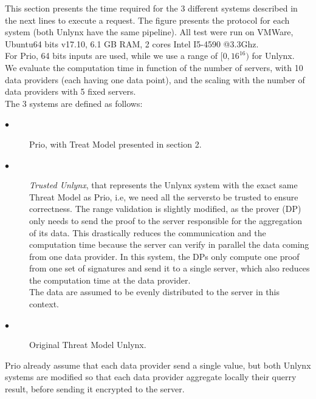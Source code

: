 \documentclass{article}
\begin{document}
This section presents the time required for the 3 different systems described in the next lines to execute a request. The figure presents the protocol for each system (both Unlynx have the same pipeline). All test were run on VMWare, Ubuntu64 bits v17.10, 6.1 GB RAM, 2 cores Intel I5-4590 @3.3Ghz.\\
For Prio, 64 bits inputs are used, while we use a range of $[0,16^{16})$ for Unlynx.\\
We evaluate the computation time in function of the number of servers, with 10 data providers (each having one data point), and the scaling with the number of data providers with 5 fixed servers.\\
The 3 systems are defined as follows:
\begin{description}
\item[$\bullet$] Prio, with Treat Model presented in section 2.
\item[$\bullet$] \textit{Trusted Unlynx}, that represents the Unlynx system with the exact same Threat Model as Prio, i.e, we need all the serversto be trusted to ensure correctness. The range validation is slightly modified, as the prover (DP) only needs to send the proof to the server responsible for the aggregation of its data. This drastically reduces the communication and the computation time because the server can verify in parallel the data coming from one data provider. In this system, the DPs only compute one proof from one set of signatures and send it to a single server, which also reduces the computation time at the data provider.\\
The data are assumed to be evenly distributed to the server in this context.
\item[$\bullet$] Original Threat Model Unlynx.
\end{description}

Prio already assume that each data provider send a single value, but both Unlynx systems are modified so that each data provider aggregate locally their querry result, before sending it encrypted to the server.
\end{document}
